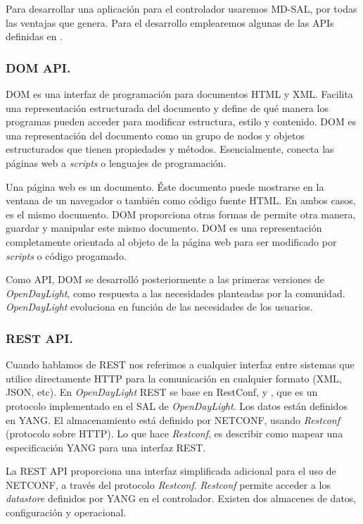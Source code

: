 \documentclass[a4paper,11pt]{book}
\begin{document}
Para desarrollar una aplicación para el controlador usaremos \ac{MD}-\ac{SAL}, por todas las ventajas que genera. Para el desarrollo emplearemos algunas de las \ac{API}s definidas en \cite{developerGuide}.

\subsubsection{\ac{DOM} \ac{API}\cite{dom}.} \ac{DOM} es una interfaz de programación para documentos \ac{HTML} y \ac{XML}. Facilita una representación estructurada del documento y define de qué manera los programas pueden acceder para modificar estructura, estilo y contenido. \ac{DOM} es una representación del documento como un grupo de nodos y objetos estructurados que tienen propiedades y métodos. Esencialmente, conecta las páginas web a \textit{scripts} o lenguajes de programación.

Una página web es un documento. Éste documento puede mostrarse en la ventana de un navegador o también como código fuente \ac{HTML}. En ambos casos, es el mismo documento. \ac{DOM} proporciona otras formas de permite otra manera, guardar y manipular este mismo documento. \ac{DOM} es una representación completamente orientada al objeto de la página web para ser modificado por \textit{scripts} o código progamado.

Como \ac{API}, \ac{DOM} se desarrolló posteriormente a las primeras versiones de \emph{OpenDayLight}, como respuesta a las necesidades planteadas por la comunidad. \emph{OpenDayLight} evoluciona en función de las necesidades de los usuarios.

\subsubsection{\ac{REST} \ac{API}.} Cuando hablamos de \ac{REST} nos referimos a cualquier interfaz entre sistemas que utilice directamente \ac{HTTP} para la comunicación en cualquier formato (\ac{XML}, \ac{JSON}, etc). En \emph{OpenDayLight} \ac{REST} se base en RestConf, \cite{restODL} y \cite{restODL2}, que es un protocolo implementado en el \ac{SAL} de \emph{OpenDayLight}. Los datos están definidos en YANG. El almacenamiento está definido por \ac{NETCONF}, usando \textit{Restconf} (protocolo sobre \ac{HTTP}). Lo que hace \textit{Restconf}, es describir como mapear una especificación YANG para una interfaz \ac{REST}. 

La \ac{REST} \ac{API} proporciona una interfaz simplificada adicional para el uso de \ac{NETCONF}, a través del protocolo \textit{Restconf}. \textit{Restconf} permite acceder a los \textit{datastore} definidos por YANG en el controlador. Existen dos almacenes de datos, configuración y operacional. 
\end{document}
